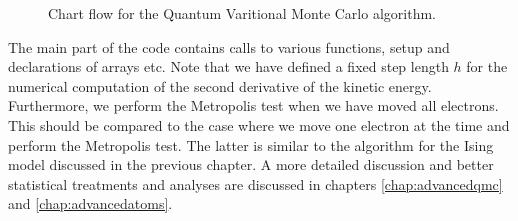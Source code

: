 \begin{figure}
\begin{centering}
\caption{Chart flow for the Quantum Varitional Monte Carlo algorithm.}\label{chartFlowMA}
\end{centering}
\end{figure}
The main part of the code contains calls to various functions, setup and 
declarations of arrays etc. 
Note that we have defined a fixed step length $h$ for the numerical computation of the second derivative 
of the kinetic energy. Furthermore, we perform the Metropolis test when we have moved all electrons.
This should be compared to the case where we move one electron at the time and perform the Metropolis test.
The latter is similar to the algorithm for the Ising model  discussed in the previous chapter.
A more detailed discussion and better statistical treatments and analyses are discussed in chapters
\ref{chap:advancedqmc} and \ref{chap:advancedatoms}. 
